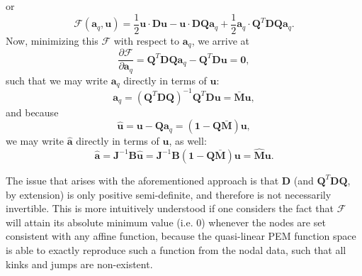 \documentclass[12pt]{article}
\begin{document}
or
\begin{equation}
        \mathcal{F} (\mathbf{a}_q, \mathbf{u}) = \frac{1}{2} \mathbf{u} \cdot \mathbf{D} \mathbf{u} - \mathbf{u} \cdot \mathbf{D} \mathbf{Q} \mathbf{a}_q + \frac{1}{2} \mathbf{a}_q \cdot \mathbf{Q}^T \mathbf{D} \mathbf{Q} \mathbf{a}_q.
\end{equation}
Now, minimizing this $\mathcal{F}$ with respect to $\mathbf{a}_q$, we arrive at
\begin{equation}
	\frac{\partial \mathcal{F}}{\partial \mathbf{a}_q} = \mathbf{Q}^T \mathbf{D} \mathbf{Q} \mathbf{a}_q - \mathbf{Q}^T \mathbf{D} \mathbf{u} = \mathbf{0},
\end{equation}
such that we may write $\mathbf{a}_q$ directly in terms of $\mathbf{u}$:
\begin{equation}
	\mathbf{a}_q = (\mathbf{Q}^T \mathbf{D} \mathbf{Q})^{-1} \mathbf{Q}^T \mathbf{D} \mathbf{u} = \bar{\mathbf{M}} \mathbf{u},
	\label{eq:aq}
\end{equation}
and because
\begin{equation}
	\hat{\mathbf{u}} = \mathbf{u} - \mathbf{Q} \mathbf{a}_q = (\mathbf{1} - \mathbf{Q} \bar{\mathbf{M}}) \mathbf{u},
\end{equation}
we may write $\hat{\mathbf{a}}$ directly in terms of $\mathbf{u}$, as well:
\begin{equation}
	\hat{\mathbf{a}} = \mathbf{J}^{-1} \mathbf{B} \hat{\mathbf{u}} = \mathbf{J}^{-1} \mathbf{B} (\mathbf{1} - \mathbf{Q} \bar{\mathbf{M}}) \mathbf{u} = \hat{\mathbf{M}} \mathbf{u}.
\end{equation}

The issue that arises with the aforementioned approach is that $\mathbf{D}$ (and $\mathbf{Q}^T \mathbf{D} \mathbf{Q}$, by extension) is only positive semi-definite, and therefore is not necessarily invertible. This is more intuitively understood if one considers the fact that $\mathcal{F}$ will attain its absolute minimum value (i.e. $0$) whenever the nodes are set consistent with any affine function, because the quasi-linear PEM function space is able to exactly reproduce such a function from the nodal data, such that all kinks and jumps are non-existent.
\end{document}
